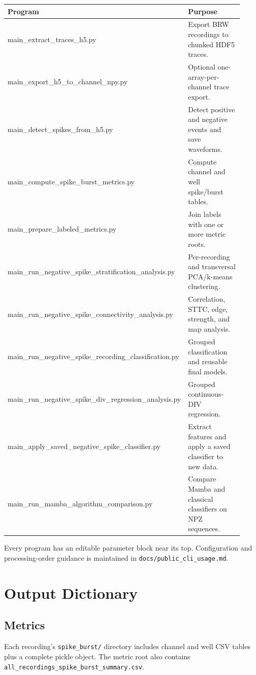\documentclass[11pt,a4paper]{article}
\newcommand{\code}[1]{\texttt{#1}}
\begin{document}
\begin{longtable}{>{\ttfamily\scriptsize\raggedright\arraybackslash}p{0.54\linewidth}p{0.38\linewidth}}
\toprule
Program & Purpose \\
\midrule
main\_extract\_traces\_h5.py & Export BRW recordings to chunked HDF5 traces. \\
main\_export\_h5\_to\_channel\_npy.py & Optional one-array-per-channel trace export. \\
main\_detect\_spikes\_from\_h5.py & Detect positive and negative events and save waveforms. \\
main\_compute\_spike\_burst\_metrics.py & Compute channel and well spike/burst tables. \\
main\_prepare\_labeled\_metrics.py & Join labels with one or more metric roots. \\
main\_run\_negative\_spike\_stratification\_analysis.py & Per-recording and transversal PCA/k-means clustering. \\
main\_run\_negative\_spike\_connectivity\_analysis.py & Correlation, STTC, edge, strength, and map analysis. \\
main\_run\_negative\_spike\_recording\_classification.py & Grouped classification and reusable final models. \\
main\_run\_negative\_spike\_div\_regression\_analysis.py & Grouped continuous-DIV regression. \\
main\_apply\_saved\_negative\_spike\_classifier.py & Extract features and apply a saved classifier to new data. \\
main\_run\_mamba\_algorithm\_comparison.py & Compare Mamba and classical classifiers on NPZ sequences. \\
\bottomrule
\end{longtable}

Every program has an editable parameter block near its top. Configuration and
processing-order guidance is maintained in \code{docs/public\_cli\_usage.md}.

\section{Output Dictionary}

\subsection{Metrics}

Each recording's \code{spike\_burst/} directory includes channel and well CSV
tables plus a complete pickle object. The metric root also contains
\code{all\_recordings\_spike\_burst\_summary.csv}.
\end{document}
